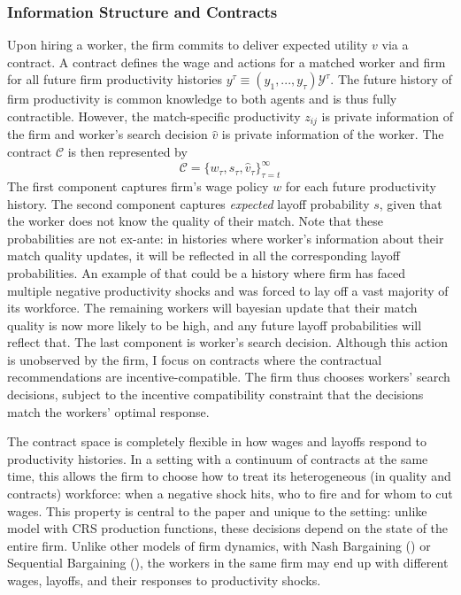 \subsubsection*{Information Structure and Contracts}
Upon hiring a worker, the firm commits to deliver expected utility $v$ via a contract. A contract defines the wage and
actions for a matched worker and firm for all future firm productivity histories $y^\tau\equiv (y_1,...,y_\tau)\mathcal{Y}^{\tau}$. The future history of firm productivity is common knowledge to both agents and is thus fully contractible. However, the match-specific productivity $z_{ij}$ is private information of the firm and worker's search decision $\hat{v}$ is private information of the worker. The contract $\mathcal{C}$ is then represented by 
\begin{equation}
\mathcal{C}=\{w_{\tau},s_{\tau},\hat{v}_\tau\}_{\tau=t}^\infty
\end{equation}
The first component captures firm's wage policy $w$ for each future productivity history. The second component captures \textit{expected} layoff probability $s$, given that the worker does not know the quality of their match. Note that these probabilities are not ex-ante: in histories where worker's information about their match quality updates, it will be reflected in all the corresponding layoff probabilities. An example of that could be a history where firm has faced multiple negative productivity shocks and was forced to lay off a vast majority of its workforce. The remaining workers will bayesian update that their match quality is now more likely to be high, and any future layoff probabilities will reflect that. 
The last component is worker's search decision. Although this action is unobserved by the firm, I focus on contracts where the contractual recommendations are incentive-compatible. The firm thus chooses workers’ search decisions, subject to the incentive compatibility constraint that the decisions match the workers’ optimal response.

The contract space is completely flexible in how wages and layoffs respond to productivity histories. In a setting with a continuum of contracts at the same time, this allows the firm to choose how to treat its heterogeneous (in quality and contracts) workforce: when a negative shock hits, who to fire and for whom to cut wages. This property is central to the paper and unique to the setting: unlike model with CRS production functions, these decisions depend on the state of the entire firm. Unlike other models of firm dynamics, with Nash Bargaining (\textcite{mccrary2022}) or Sequential Bargaining (\textcite{bilal2022}), the workers in the same firm may end up with different wages, layoffs, and their responses to productivity shocks. %
